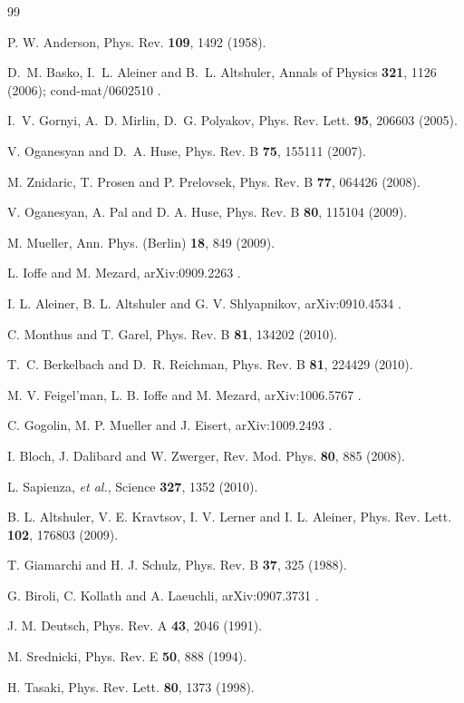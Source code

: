 \documentclass[letterpaper, twocolumn,superscriptaddress, showpacs,preprintnumbers,amsmath,amssymb]{revtex4}
\begin{document}
\begin{thebibliography}{99}

P. W. Anderson, Phys. Rev. {\bf 109}, 1492 (1958).

D.~M. Basko, I.~L. Aleiner and B.~L. Altshuler, Annals of Physics
{\bf 321}, 1126 (2006); cond-mat/0602510 .

I.~V. Gornyi, A.~D. Mirlin, D.~G. Polyakov, Phys. Rev. Lett. {\bf 95}, 206603 (2005).

V. Oganesyan and D.~A. Huse, Phys. Rev. B {\bf 75}, 155111 (2007).

M. Znidaric, T. Prosen and P. Prelovsek, Phys. Rev. B {\bf 77}, 064426 (2008).

V. Oganesyan, A. Pal and D. A. Huse,
Phys. Rev. B {\bf 80}, 115104 (2009).

M. Mueller, Ann. Phys. (Berlin) {\bf 18}, 849 (2009).

L. Ioffe and M. Mezard, arXiv:0909.2263 .

I. L. Aleiner, B. L. Altshuler and G. V. Shlyapnikov,  arXiv:0910.4534 .

C. Monthus and T. Garel, Phys. Rev. B {\bf 81}, 134202 (2010).

T.~C. Berkelbach and D.~R. Reichman,
Phys. Rev. B {\bf 81}, 224429 (2010).

M. V. Feigel'man, L. B. Ioffe and M. Mezard, arXiv:1006.5767  .

C. Gogolin, M. P. Mueller and J. Eisert, arXiv:1009.2493  .

I. Bloch, J. Dalibard and W. Zwerger, Rev. Mod. Phys. {\bf 80}, 885 (2008).

L. Sapienza, {\it et al.}, Science {\bf 327}, 1352 (2010).

B. L. Altshuler, V. E. Kravtsov, I. V. Lerner and I. L. Aleiner, 	
Phys. Rev. Lett. {\bf 102}, 176803 (2009).

T. Giamarchi and H. J. Schulz, Phys. Rev. B {\bf 37},
325 (1988).

 G. Biroli, C. Kollath and A. Laeuchli,  arXiv:0907.3731  .

J. M. Deutsch, Phys. Rev. A {\bf 43}, 2046 (1991).

M. Srednicki, Phys. Rev. E {\bf 50}, 888 (1994).

H. Tasaki, Phys. Rev. Lett. {\bf 80}, 1373 (1998).


\end{thebibliography}
\end{document}
